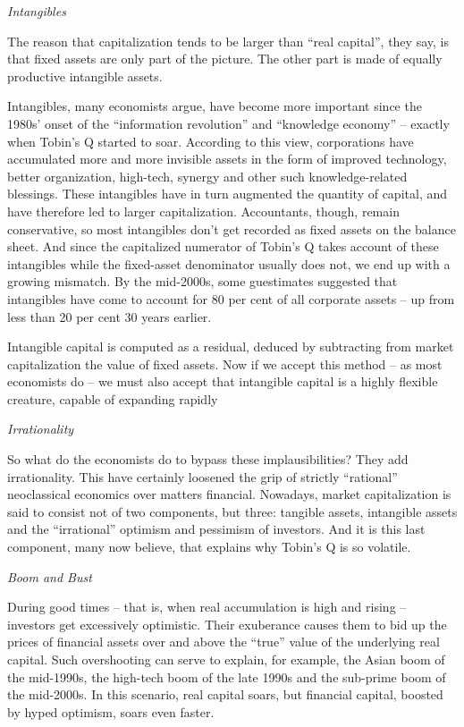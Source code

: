 \documentclass[
]{book}
\begin{document}
\emph{Intangibles}

The reason that capitalization tends to be larger than ``real capital'', they say, is that fixed assets are only part of the picture. The other part is made of equally productive intangible assets.

Intangibles, many economists argue, have become more important since the 1980s' onset of the ``information revolution'' and ``knowledge economy'' -- exactly when Tobin's Q started to soar. According to this view, corporations have accumulated more and more invisible assets in the form of improved technology, better organization, high-tech, synergy and other such knowledge-related blessings. These intangibles have in turn augmented the quantity of capital, and have therefore led to larger capitalization. Accountants, though, remain conservative, so most intangibles don't get recorded as fixed assets on the balance sheet. And since the capitalized numerator of Tobin's Q takes account of these intangibles while the fixed-asset denominator usually does not, we end up with a growing mismatch. By the mid-2000s, some guestimates suggested that intangibles have come to account for 80 per cent of all corporate assets -- up from less than 20 per cent 30 years earlier.

Intangible capital is computed as a residual, deduced by subtracting from market capitalization the value of fixed assets. Now if we accept this method -- as most economists do -- we must also accept that intangible capital is a highly flexible creature, capable of expanding rapidly

\emph{Irrationality}

So what do the economists do to bypass these implausibilities? They add irrationality.
This have certainly loosened the grip of strictly ``rational'' neoclassical economics over matters financial. Nowadays, market capitalization is said to consist not of two components, but three: tangible assets, intangible assets and the ``irrational'' optimism and pessimism of investors. And it is this last component, many now believe, that explains why Tobin's Q is so volatile.

\emph{Boom and Bust}

During good times -- that is, when real accumulation is high and rising -- investors get excessively optimistic. Their exuberance causes them to bid up the prices of financial assets over and above the ``true'' value of the underlying real capital. Such overshooting can serve to explain, for example, the Asian boom of the mid-1990s, the high-tech boom of the late 1990s and the sub-prime boom of the mid-2000s. In this scenario, real capital soars, but financial capital, boosted by hyped optimism, soars even faster.
\end{document}
